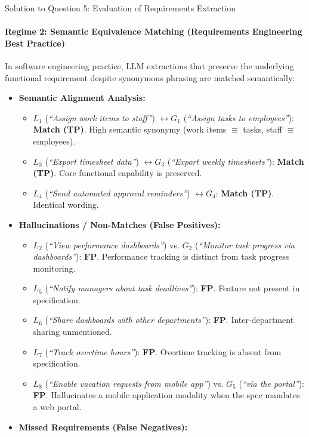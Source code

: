 \documentclass[11pt,a4paper]{article}
\begin{document}
\begin{solutionbox}{Solution to Question 5: Evaluation of Requirements Extraction}
\paragraph{Regime 2: Semantic Equivalence Matching (Requirements Engineering Best Practice)}
In software engineering practice, LLM extractions that preserve the underlying functional requirement despite synonymous phrasing are matched semantically:
\begin{itemize}[leftmargin=1.5em]
    \item \textbf{Semantic Alignment Analysis:}
    \begin{itemize}
        \item $L_1$ (\textit{“Assign work items to staff”}) $\longleftrightarrow G_1$ (\textit{“Assign tasks to employees”}): \textbf{Match (TP)}. High semantic synonymy (work items $\equiv$ tasks, staff $\equiv$ employees).
        \item $L_3$ (\textit{“Export timesheet data”}) $\longleftrightarrow G_3$ (\textit{“Export weekly timesheets”}): \textbf{Match (TP)}. Core functional capability is preserved.
        \item $L_4$ (\textit{“Send automated approval reminders”}) $\longleftrightarrow G_4$: \textbf{Match (TP)}. Identical wording.
    \end{itemize}
    \item \textbf{Hallucinations / Non-Matches (False Positives):}
    \begin{itemize}
        \item $L_2$ (\textit{“View performance dashboards”}) vs. $G_2$ (\textit{“Monitor task progress via dashboards”}): \textbf{FP}. Performance tracking is distinct from task progress monitoring.
        \item $L_5$ (\textit{“Notify managers about task deadlines”}): \textbf{FP}. Feature not present in specification.
        \item $L_6$ (\textit{“Share dashboards with other departments”}): \textbf{FP}. Inter-department sharing unmentioned.
        \item $L_7$ (\textit{“Track overtime hours”}): \textbf{FP}. Overtime tracking is absent from specification.
        \item $L_8$ (\textit{“Enable vacation requests from mobile app”}) vs. $G_5$ (\textit{“via the portal”}): \textbf{FP}. Hallucinates a mobile application modality when the spec mandates a web portal.
    \end{itemize}
    \item \textbf{Missed Requirements (False Negatives):}

\end{itemize}
\end{solutionbox}
\end{document}
